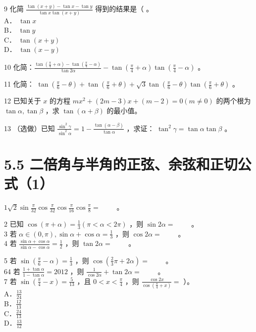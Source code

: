\documentclass[10pt]{article}
\begin{document}
9 化简 \(\frac{\tan (x+y)-\tan x-\tan y}{\tan x \tan (x+y)}\) 得到的结果是（ 。\\
A． \(\tan x\)\\
B． \(\tan y\)\\
C． \(\tan (x+y)\)\\
D． \(\tan (x-y)\)

10 化简：\(\frac{\tan \left(\frac{\pi}{4}+\alpha\right)-\tan \left(\frac{\pi}{4}-\alpha\right)}{\tan 2 \alpha}-\tan \left(\frac{\pi}{4}+\alpha\right) \tan \left(\frac{\pi}{4}-\alpha\right)\) 。

11 化简： \(\tan \left(\frac{\pi}{6}-\theta\right)+\tan \left(\frac{\pi}{6}+\theta\right)+\sqrt{3} \tan \left(\frac{\pi}{6}-\theta\right) \tan \left(\frac{\pi}{6}+\theta\right)\) 。

12 已知关于 \(x\) 的方程 \(m x^{2}+(2 m-3) x+(m-2)=0(m \neq 0)\) 的两个根为 \(\tan \alpha, \tan \beta\) ，求 \(\tan (\alpha+\beta)\) 的最小值。

13 （选做）已知 \(\frac{\sin ^{2} \gamma}{\sin ^{2} \alpha}=1-\frac{\tan (\alpha-\beta)}{\tan \alpha}\) ，求证： \(\tan ^{2} \gamma=\tan \alpha \tan \beta\) 。

\section*{5.5 二倍角与半角的正弦、余弦和正切公式（1）}
\(1 \sqrt{2} \sin \frac{\pi}{32} \cos \frac{\pi}{32} \cos \frac{\pi}{16} \cos \frac{\pi}{8}=\) \(\qquad\)。

2 已知 \(\cos (\pi+\alpha)=\frac{1}{3}(\pi<\alpha<2 \pi)\) ，则 \(\sin 2 \alpha=\) \(\qquad\)。\\
3 若 \(\alpha \in(0, \pi), \sin \alpha+\cos \alpha=\frac{1}{3}\) ，则 \(\cos 2 \alpha=\) \(\qquad\)。\\
4 若 \(\frac{\sin \alpha+\cos \alpha}{\sin \alpha-\cos \alpha}=\frac{1}{2}\) ，则 \(\tan 2 \alpha=\) \(\qquad\)。

5 若 \(\sin \left(\frac{\pi}{6}-\alpha\right)=\frac{1}{3}\) ，则 \(\cos \left(\frac{2}{3} \pi+2 \alpha\right)=\) \(\qquad\)。\\
64 若 \(\frac{1+\tan \alpha}{1-\tan \alpha}=2012\) ，则 \(\frac{1}{\cos 2 \alpha}+\tan 2 \alpha=\) \(\qquad\)。\\
7 若 \(\sin \left(\frac{\pi}{4}-x\right)=\frac{5}{13}\) ，且 \(0<x<\frac{\pi}{4}\) ，则 \(\frac{\cos 2 x}{\cos \left(\frac{\pi}{4}+x\right)}=\) ）。\\
A．\(\frac{13}{24}\)\\
B．\(\frac{12}{13}\)\\
C．\(\frac{24}{13}\)\\
D．\(\frac{13}{12}\)
\end{document}
